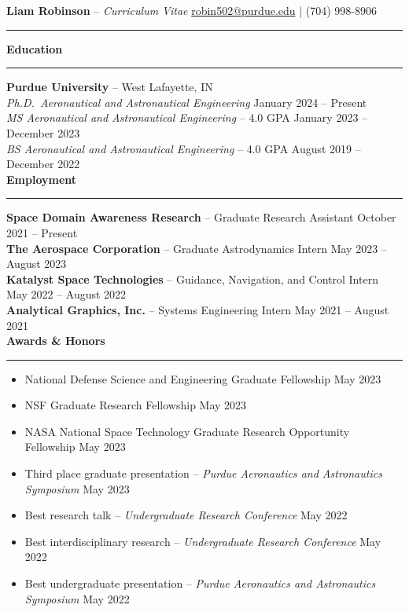 \documentclass[11pt, a4paper]{article}
\newcommand{\sectiontitle}[1]{{\Large \textbf{#1}}\vspace{0.5em}\hrule\vspace{0.5em}}
\begin{document}
\thispagestyle{empty}

\sffamily

\noindent
\textbf{\huge Liam Robinson} -- \textit{\huge Curriculum Vitae} \hfill \href{mailto:robin502@purdue.edu}{robin502@purdue.edu} | (704) 998-8906
\rule{\linewidth}{4pt}
\vspace{-0.5em}

\sectiontitle{Education}
\textbf{Purdue University} -- West Lafayette, IN \\
\textit{Ph.D.\ Aeronautical and Astronautical Engineering} \hfill January 2024 -- Present \\
\textit{MS Aeronautical and Astronautical Engineering} -- 4.0 GPA \hfill January 2023 -- December 2023 \\
\textit{BS Aeronautical and Astronautical Engineering} -- 4.0 GPA \hfill August 2019 -- December 2022 \\

\sectiontitle{Employment}
\textbf{Space Domain Awareness Research} -- Graduate Research Assistant \hfill October 2021 -- Present \\
\textbf{The Aerospace Corporation} -- Graduate Astrodynamics Intern \hfill May 2023 -- August 2023 \\
\textbf{Katalyst Space Technologies} -- Guidance, Navigation, and Control Intern \hfill May 2022 -- August 2022 \\
\textbf{Analytical Graphics, Inc.} -- Systems Engineering Intern \hfill May 2021 -- August 2021 \\


\sectiontitle{Awards \& Honors}
\begin{itemize}[noitemsep]
    \item National Defense Science and Engineering Graduate Fellowship \hfill May 2023
    \item NSF Graduate Research Fellowship \hfill May 2023
    \item NASA National Space Technology Graduate Research Opportunity Fellowship \hfill May 2023
    \item Third place graduate presentation -- \textit{Purdue Aeronautics and Astronautics Symposium} \hfill May 2023
    \item Best research talk -- \textit{Undergraduate Research Conference} \hfill May 2022
    \item Best interdisciplinary research -- \textit{Undergraduate Research Conference} \hfill May 2022
    \item Best undergraduate presentation -- \textit{Purdue Aeronautics and Astronautics Symposium} \hfill May 2022
\end{itemize}
\end{document}
